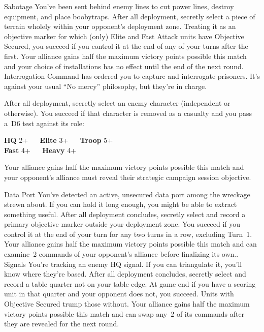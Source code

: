 \documentclass[nobackground]{40k}
\begin{document}
\noindent%
\covertcard%
{Sabotage}%
{You've been sent behind enemy lines to cut power lines, destroy
  equipment, and place boobytraps.}%
{After all deployment, secretly select a piece of terrain wholely
  within your opponent's deployment zone.  Treating it as an objective
  marker for which (only) Elite and Fast Attack units have Objective
  Secured, you succeed if you control it at the end of any of your
  turns after the first.}%
{Your alliance gains half the maximum victory points possible this
  match and your choice of installations has no effect until the end
  of the next round.}  \hfill%
\covertcard%
{Interrogation}%
{Command has ordered you to capture and interrogate prisoners.  It's
  against your usual ``No mercy'' philosophy, but they're in charge.}%
{After all deployment, secretly select an enemy character (independent
  or otherwise).  You succeed if that character is removed as a
  casualty and you pass a~D6 test against its role:

\bigskip
\begin{minipage}{1.0\linewidth}\centering
\textbf{HQ} 2+ ~~ \textbf{Elite} 3+ ~~ \textbf{Troop} 5+\\
\textbf{Fast} 4+ ~~ \textbf{Heavy} 4+  
\end{minipage}}%
{Your alliance gains half the maximum victory points possible this
  match and your opponent's alliance must reveal their strategic
  campaign session objective.}

\noindent%
\covertcard%
{Data Port}%
{You've detected an active, unsecured data port among the wreckage
  strewn about.  If you can hold it long enough, you might be able to
  extract something useful.}%
{After all deployment concludes, secretly select and record a primary
  objective marker outside your deployment zone.  You succeed if you
  control it at the end of your turn for any two turns in a row,
  excluding Turn~1.}%
{Your alliance gains half the maximum victory points possible this
  match and can examine~2 commands of your opponent's alliance before
  finalizing its own..} \hfill%
\covertcard%
{Signals}%
{You're tracking an enemy HQ signal.  If you can triangulate it,
  you'll know where they're based.}%
{After all deployment concludes, secretly select and record a table
  quarter not on your table edge.  At game end if you have a scoring
  unit in that quarter and your opponent does not, you succeed.  Units
  with Objective Secured trump those without.}%
{Your alliance gains half the maximum victory points possible this
  match and can swap any~2 of its commands after they are revealed for
  the next round.}
\end{document}
